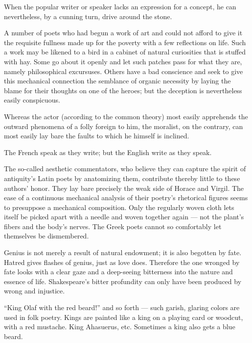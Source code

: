 \documentclass[12pt,a4paper]{article}
\newcommand{\opage}[1]{\marginnote{\footnotesize\textit{[#1]}}}
\newcommand{\aphsep}{\par\smallskip\centerline{\textasteriskcentered}\smallskip}
\begin{document}
\aphsep

When the popular writer or speaker lacks an expression for a concept, he can
nevertheless, by a cunning turn, drive around the stone.

\aphsep

A number of poets who had begun a work of art and could not afford to give it the
requisite fullness made up for the poverty with a few reflections on life. Such a
work may be likened to a bird in a cabinet of natural curiosities that is
\opage{38}stuffed with hay. Some go about it openly and let such patches pass for
what they are, namely philosophical excursuses. Others have a bad conscience and
seek to give this mechanical connection the semblance of organic necessity by
laying the blame for their thoughts on one of the heroes; but the deception is
nevertheless easily conspicuous.

\aphsep

Whereas the actor (according to the common theory) most easily apprehends the
outward phenomena of a folly foreign to him, the moralist, on the contrary, can
most easily lay bare the faults to which he himself is inclined.

\aphsep

The French speak as they write; but the English write as they speak.

\aphsep

The so-called aesthetic commentators, who believe they can capture the spirit of
antiquity's Latin poets by anatomizing them, contribute thereby little to these
authors' honor. They lay bare precisely the weak side of Horace and Virgil. The
ease of a continuous mechanical analysis of their poetry's rhetorical figures
seems to presuppose a mechanical composition. Only the regularly woven cloth lets
itself be picked apart with a needle and woven together again --- not the plant's
fibers and the body's nerves. The Greek poets cannot so comfortably let
themselves be dismembered.

\aphsep

Genius is not merely a result of natural endowment; it is also begotten by fate.
Hatred gives flashes of genius, just as love does. Therefore the one wronged by
fate looks with a clear gaze and a deep-seeing bitterness into the nature and
essence of life. Shakespeare's bitter profundity can only have been produced by
wrong and injustice.

\aphsep

\opage{39}``King Olaf with the red beard!'' and so forth --- such garish, glaring
colors are used in folk poetry. Kings are painted like a king on a playing card
or woodcut, with a red mustache. King Ahasuerus, etc. Sometimes a king also gets
a blue beard.
\end{document}
